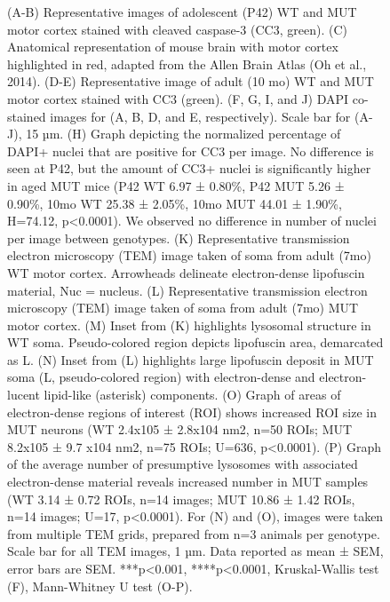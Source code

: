 \begin{figure}[!ht]
	\begin{fullwidth}
	\begin{center}
	\captionsetup{labelformat=adja-page}
	\ContinuedFloat
	\caption{
                (A-B) Representative images of adolescent (P42) WT and MUT motor cortex stained
		with cleaved caspase-3 (CC3, green).
		(C) Anatomical representation of mouse brain with motor cortex highlighted in
		red, adapted from the Allen Brain Atlas (Oh et al., 2014). 
		(D-E) Representative image of adult (10 mo) WT and MUT motor cortex stained with
		CC3 (green).  
		(F, G, I, and J) DAPI co-stained images for (A, B, D, and E, respectively).
		Scale bar for (A-J), 15 µm. 
		(H) Graph depicting the normalized percentage of DAPI+ nuclei that are positive
		for CC3 per image. No difference is seen at P42, but the amount of CC3+ nuclei
		is significantly higher in aged MUT mice (P42 WT 6.97 ± 0.80\%, P42 MUT 5.26 ±
		0.90\%, 10mo WT 25.38 ± 2.05\%, 10mo MUT 44.01 ± 1.90\%, H=74.12, p<0.0001). We
		observed no difference in number of nuclei per image between genotypes. 
		(K) Representative transmission electron microscopy (TEM) image taken of soma
		from adult (7mo) WT motor cortex. Arrowheads delineate electron-dense lipofuscin
		material, Nuc = nucleus. 
		(L) Representative transmission electron microscopy (TEM) image taken of soma
		from adult (7mo) MUT motor cortex. 
		(M) Inset from (K) highlights lysosomal structure in WT soma. Pseudo-colored
		region depicts lipofuscin area, demarcated as L. 
		(N) Inset from (L) highlights large lipofuscin deposit in MUT soma (L,
		pseudo-colored region) with electron-dense and electron-lucent lipid-like
		(asterisk) components. 
		(O) Graph of areas of electron-dense regions of interest (ROI) shows increased
		ROI size in MUT neurons (WT 2.4x105 ± 2.8x104 nm2, n=50 ROIs; MUT 8.2x105 ± 9.7
		x104 nm2, n=75 ROIs; U=636, p<0.0001). 
		(P) Graph of the average number of presumptive lysosomes with associated
		electron-dense material reveals increased number in MUT samples (WT 3.14 ± 0.72
		ROIs, n=14 images; MUT 10.86 ± 1.42 ROIs, n=14 images; U=17, p<0.0001). For (N)
		and (O), images were taken from multiple TEM grids, prepared from n=3 animals
		per genotype. Scale bar for all TEM images, 1 µm. Data reported as mean ± SEM,
		error bars are SEM. ***p<0.001, ****p<0.0001, Kruskal-Wallis test (F),
		Mann-Whitney U test (O-P).
	}
	\label{fig:fig5}
	\end{center}
	\end{fullwidth}
\end{figure}


